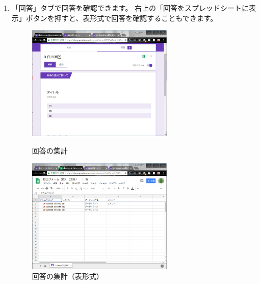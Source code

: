 \documentclass[11pt,a4paper]{jsarticle}
\begin{document}
\begin{enumerate}
                \item 「回答」タブで回答を確認できます。
                    右上の「回答をスプレッドシートに表示」ボタンを押すと、表形式で回答を確認することもできます。
                    \begin{figure}[htbp]
                        \begin{minipage}{0.5\hsize}
                         \begin{center}
                          \includegraphics[width=70mm]{./image/form05.eps}
                         \end{center}
                         \caption{回答の集計}
                         \label{fig:form05}
                        \end{minipage}
                        \begin{minipage}{0.5\hsize}
                         \begin{center}
                          \includegraphics[width=70mm]{./image/form06.eps}
                         \end{center}
                         \caption{回答の集計（表形式）}
                         \label{fig:form06}
                        \end{minipage}
                    \end{figure}

                \end{enumerate}
\end{document}
